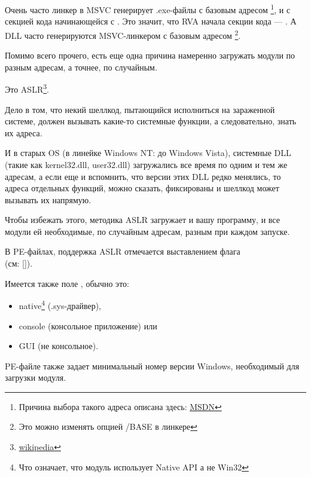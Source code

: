 \par Очень часто линкер в \ac{MSVC} генерирует .exe-файлы с базовым адресом  \footnote{Причина выбора такого адреса описана здесь: \href{http://go.yurichev.com/17041}{MSDN}},
и с секцией кода начинающейся с .
Это значит, что \ac{RVA} начала секции кода --- .
А \ac{DLL} часто генерируются MSVC-линкером с базовым адресом \footnote{Это можно изменять опцией /BASE в линкере}.

Помимо всего прочего, есть еще одна причина намеренно загружать модули по разным адресам, а точнее, по случайным.

Это \ac{ASLR}\footnote{\href{http://go.yurichev.com/17042}{wikipedia}}.

Дело в том, что некий шеллкод, пытающийся исполниться на зараженной системе, должен вызывать какие-то системные функции, а следовательно, знать их адреса.

И в старых \ac{OS} (в линейке \gls{Windows NT}: до Windows Vista),
системные DLL (такие как kernel32.dll, user32.dll) загружались все время
по одним и тем же адресам, 
а если еще и вспомнить, что версии этих DLL редко менялись, то адреса отдельных
функций, можно сказать, фиксированы и шеллкод может вызывать их напрямую.

Чтобы избежать этого, методика \ac{ASLR}
загружает и вашу программу, и все модули ей необходимые, по случайным адресам, разным при каждом запуске.

В PE-файлах, поддержка \ac{ASLR} отмечается выставлением флага \\
 (см: [\Russinovich]).


Имеется также поле , обычно это:

\begin{itemize}
\item native\footnote{Что означает, что модуль использует Native API а не Win32} (.sys-драйвер), 

\item console (консольное приложение) или

\item \ac{GUI} (не консольное).
\end{itemize}


PE-файле также задает минимальный номер версии Windows, необходимый для загрузки модуля.


